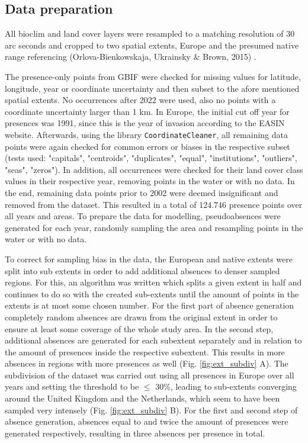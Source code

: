 \documentclass[12pt,a4paper]{article}
\begin{document}
\subsection{Data preparation} \label{ssec:datapreparation}
All bioclim and land cover layers were resampled to a matching resolution of 30 arc seconds and cropped to two spatial extents, Europe and the presumed native range referencing (Orlova-Bienkowskaja, Ukrainsky \& Brown, 2015) \autocite{orlova2015harmonia}.

The presence-only points from GBIF were checked for missing values for latitude, longitude, year or coordinate uncertainty and then subset to the afore mentioned spatial extents.
No occurrences after 2022 were used, also no points with a coordinate uncertainty larger than 1 km.
In Europe, the initial cut off year for presences was 1991, since this is the year of invasion according to the EASIN website.
Afterwards, using the library \texttt{CoordinateCleaner}, all remaining data points were again checked for common errors or biases in the respective subset  (tests used: "capitals", "centroids", "duplicates", "equal", "institutions", "outliers", "seas", "zeros").
In addition, all occurrences were checked for their land cover class values in their respective year, removing points in the water or with no data.
In the end, remaining data points prior to 2002 were deemed insignificant and removed from the dataset.
This resulted in a total of 124.746 presence points over all years and areas.
To prepare the data for modelling, pseudoabsences were generated for each year, randomly sampling the area and resampling points in the water or with no data.

To correct for sampling bias in the data, the European and native extents were split into sub extents in order to add additional absences to denser sampled regions.
For this, an algorithm was written which splits a given extent in half and continues to do so with the created sub-extents until the amount of points in the extents is at most some chosen number.
For the first part of absence generation completely random absences are drawn from the original extent in order to ensure at least some coverage of the whole study area.
In the second step, additional absences are generated for each subextent separately and in relation to the amount of presences inside the respective subextent.
This results in more absences in regions with more presences as well (Fig. \ref{fig:ext_subdiv} A).
The subdivision of the dataset was carried out using all presences in Europe over all years and setting the threshold to be $\leq$ 30\%, leading to sub-extents converging around the United Kingdom and the Netherlands, which seem to have been sampled very intensely (Fig. \ref{fig:ext_subdiv} B).
For the first and second step of absence generation, absences equal to and twice the amount of presences were generated respectively, resulting in three absences per presence in total.
\end{document}
